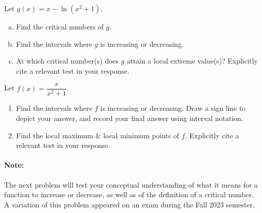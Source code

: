 \documentclass[10pt]{article}
\begin{document}


{} Let $g(x)=x-\ln(x^2+1)$.
%
\begin{enumerate}[(a)]
\item Find the critical numbers of $g$.

\vfill

\item Find the intervals where $g$ is increasing or decreasing.

\vfill
\vfill

\item At which critical number(s) does $g$ attain a local extreme value(s)? Explicitly cite a relevant test in your response.

\vfill

\end{enumerate}

\newpage

{} Let $f(x)=\dfrac{x}{x^2+1}$.
\begin{enumerate}
\item[(a)]Find the intervals where $f$ is increasing or decreasing. Draw a sign line to depict your answer, and record your final answer using interval notation. \\

\vfill
\vfill
\vfill


\item[(b)]Find the local maximum \& local minimum points of $f$. Explicitly cite a relevant test in your response. \\

\vfill
\vfill

\end{enumerate}

\newpage


\paragraph*{Note:} The next problem will test your conceptual understanding of what it means for a function to increase or decrease, as well as of the definition of a critical number. A variation of this problem appeared on an exam during the Fall 2023 semester.\\
\end{document}
